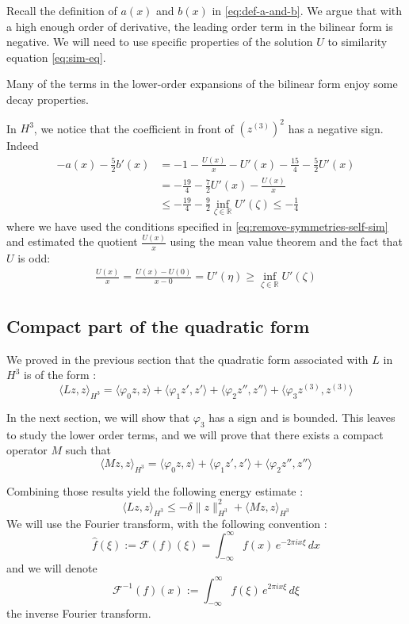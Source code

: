 \documentclass[11pt,a4paper]{article}
\begin{document}
Recall the definition of $a(x)$ and $b(x)$ in \ref{eq:def-a-and-b}. We argue that with a high enough order of derivative, the leading order term in the bilinear form is negative. We will need to use specific properties of the solution $U$ to similarity equation \ref{eq:sim-eq}.

Many of the terms in the lower-order expansions of the bilinear form enjoy some decay properties. 

In $H^3$, we notice that the coefficient in front of $(z^{(3)})^2$ has a negative sign. Indeed
\begin{align*}
    -a(x)-\frac{5}{2}b'(x) &= -1-\frac{U(x)}{x} - U'(x) - \frac{15}{4} - \frac{5}{2}U'(x) \\
    & = -\frac{19}{4} - \frac{7}{2}U'(x) - \frac{U(x)}{x} \\
    &\le -\frac{19}{4} - \frac{9}{2}\inf_{\zeta \in \mathbb{R}} U'(\zeta) \le -\frac{1}{4}
\end{align*}
where we have used the conditions specified in \ref{eq:remove-symmetries-self-sim} and estimated the quotient $\frac{U(x)}{x}$ using the mean value theorem and the fact that $U$ is odd:
\begin{align*}
    \frac{U(x)}{x} = \frac{U(x)-U(0)}{x-0} = U'(\eta)\ge \inf_{\zeta\in\mathbb{R}} U'(\zeta)
\end{align*}

\subsection{Compact part of the quadratic form}
We proved in the previous section that the quadratic form associated with $L$ in $H^3$ is of the form :
\[ \langle Lz, z \rangle_{H^3} =  \langle \varphi_0 z, z \rangle +\langle \varphi_1 z', z' \rangle +\langle \varphi_2 z'', z'' \rangle +\langle \varphi_3 z^{(3)}, z^{(3)} \rangle\]

In the next section, we will show that $\varphi_3$ has a sign and is bounded. This leaves to study the lower order terms, and we will prove that there exists a compact operator $M$ such that 
\[\langle Mz, z \rangle_{H^3} =  \langle \varphi_0 z, z \rangle +\langle \varphi_1 z', z' \rangle +\langle \varphi_2 z'', z'' \rangle\]

Combining those results yield the following energy estimate :
\begin{equation}\label{energy}
\langle Lz, z \rangle_{H^3} \leq -\delta \|z\|_{H^3}^2  + \langle Mz, z \rangle_{H^3} 
\end{equation}
We will use the Fourier transform, with the following convention :
\[
\hat{f}(\xi) := \mathcal{F}(f)(\xi) = \int_{-\infty}^{\infty} f(x) \, e^{-2\pi i x \xi} \, dx
\]
and we will denote \[\mathcal{F}^{-1}(f)(x) := \int_{-\infty}^{\infty} f(\xi) \, e^{2\pi i x \xi} \, d\xi\]
the inverse Fourier transform.
\end{document}
